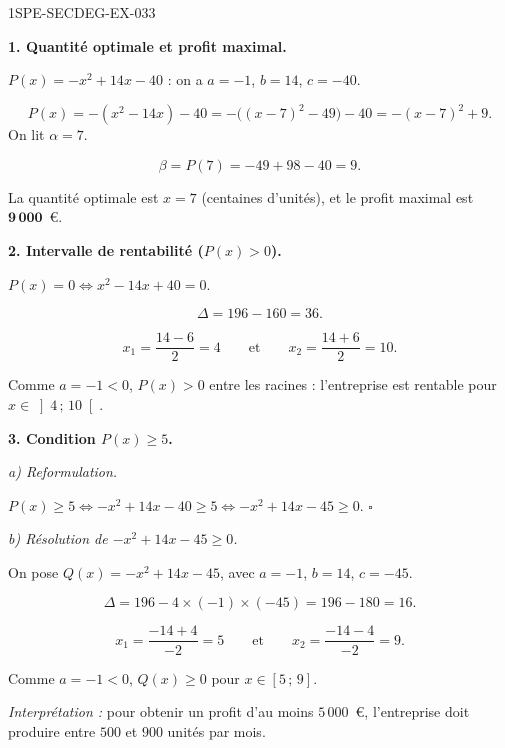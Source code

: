 \begin{corrige}{1SPE-SECDEG-EX-033}

\textbf{1. Quantité optimale et profit maximal.}


$P(x) = -x^2 + 14x - 40$ : on a $a = -1$, $b = 14$, $c = -40$.

\[P(x)=-(x^2-14x)-40=-\bigl((x-7)^2-49\bigr)-40=-(x-7)^2+9.\]
On lit $\alpha=7$.

\[\beta = P(7) = -49 + 98 - 40 = 9.\]

La quantité optimale est $x = 7$ (centaines d'unités), et le profit maximal est $\mathbf{9\,000}$~\euro.

\medskip
\textbf{2. Intervalle de rentabilité ($P(x) > 0$).}


$P(x) = 0 \iff x^2 - 14x + 40 = 0$.

\[\Delta = 196 - 160 = 36.\]

\[x_1 = \frac{14 - 6}{2} = 4 \qquad \text{et} \qquad x_2 = \frac{14 + 6}{2} = 10.\]

Comme $a = -1 < 0$, $P(x) > 0$ entre les racines : l'entreprise est rentable pour $x \in \left]4\,;\,10\right[$.

\medskip
\textbf{3. Condition $P(x) \geqslant 5$.}

\textit{a) Reformulation.}


$P(x) \geqslant 5 \iff -x^2 + 14x - 40 \geqslant 5 \iff -x^2 + 14x - 45 \geqslant 0$. \hfill $\square$

\textit{b) Résolution de $-x^2 + 14x - 45 \geqslant 0$.}


On pose $Q(x) = -x^2 + 14x - 45$, avec $a = -1$, $b = 14$, $c = -45$.

\[\Delta = 196 - 4 \times (-1) \times (-45) = 196 - 180 = 16.\]

\[x_1 = \frac{-14 + 4}{-2} = 5 \qquad \text{et} \qquad x_2 = \frac{-14 - 4}{-2} = 9.\]

Comme $a = -1 < 0$, $Q(x) \geqslant 0$ pour $x \in [5\,;\,9]$.

\textit{Interprétation :} pour obtenir un profit d'au moins $5\,000$~\euro, l'entreprise doit produire entre $500$ et $900$ unités par mois.

\end{corrige}
